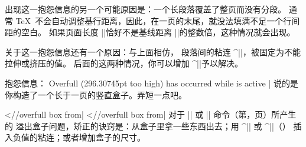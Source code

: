 
出现这一抱怨信息的另一个可能原因是：一个长段落覆盖了整页而没有分段。
通常 \TeX\ 不会自动调整基行距离，因此，在一页的末尾，就没法填满不足一个行间距的空白。
如果页面长度 |\vsize|\ctsref{\vsize}恰好不是基线距离
|\baselineskip|\ctsref{\baselineskip}的整数倍，这种情况就会出现。


关于这一抱怨信息还有一个原因：与上面相仿，
段落间的粘连 ^|\parskip|\ctsref{\parskip}，被固定为不能拉伸或挤压的值。
后面的这两种情况，你可以增加 ^|\vfuzz|\ctsref\vfuzz 予以解决。


\li 抱怨信息：
\csdisplay
Overfull \vbox (296.30745pt too high) has occurred
   while \output is active
|
说的是你构造了一个长于一页的竖直盒子。弄短一点吧。


\li
\bix^^|\hbox//overfull box from|
\bix^^|\vbox//overfull box from|
对于 |\hbox| 或 |\vbox| 命令（第\xrefn\hbox ，\xrefn\vbox 页）所产生的
溢出盒子问题，矫正的诀窍是：从盒子里拿一些东西出去；用 ^|\hss| 或 ^|\vss|（\xref\hss ）
插入负值的粘连；或者增加盒子的尺寸。


